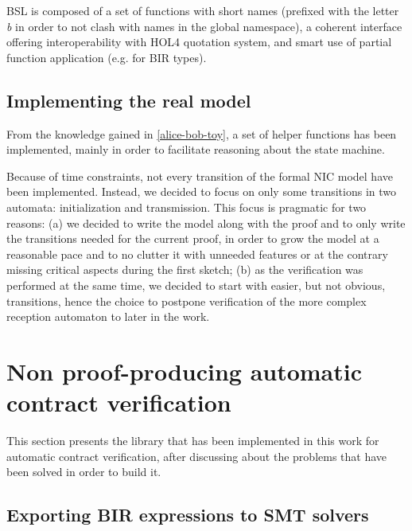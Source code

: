 \documentclass[10pt,a4paper]{article}
\begin{document}
\begin{multicols}{2}
BSL is composed of a set of functions with short names (prefixed with the letter \textit{b} in order to not clash with names in the global namespace), a coherent interface offering interoperability with HOL4 quotation system, and smart use of partial function application (e.g. for BIR types).

\subsection{Implementing the real model} \label{impl-real-model}

From the knowledge gained in \ref{alice-bob-toy}, a set of helper functions has been implemented, mainly in order to facilitate reasoning about the state machine.

Because of time constraints, not every transition of the formal NIC model have been implemented. Instead, we decided to focus on only some transitions in two automata: initialization and transmission. This focus is pragmatic for two reasons: (a) we decided to write the model along with the proof and to only write the transitions needed for the current proof, in order to grow the model at a reasonable pace and to no clutter it with unneeded features or at the contrary missing critical aspects during the first sketch; (b) as the verification was performed at the same time, we decided to start with easier, but not obvious, transitions, hence the choice to postpone verification of the more complex reception automaton to later in the work.


\section{Non proof-producing automatic contract verification} \label{impl-non-pp-wp-lib}

This section presents the library that has been implemented in this work for automatic contract verification, after discussing about the problems that have been solved in order to build it.

\subsection{Exporting BIR expressions to SMT solvers} \label{exporting-bir-to-smt}


\end{multicols}
\end{document}
